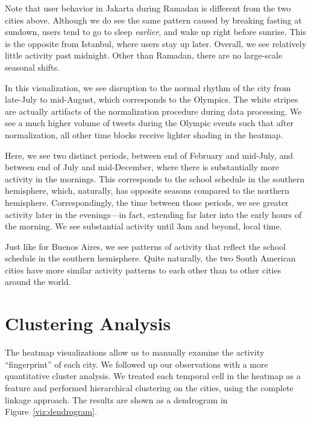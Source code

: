 \documentclass[letterpaper]{article}
\begin{document}
Note that user behavior in Jakarta during Ramadan is different from
the two cities above. Although we do see the same pattern caused
by breaking fasting at sundown, users tend to go to sleep
{\it earlier}, and wake up right before sunrise.
This is the opposite from Istanbul, where
users stay up later. Overall, we see relatively little activity past midnight. Other
than Ramadan, there are no large-scale seasonal shifts.


\smallskip {} In this visualization, we see
disruption to the normal rhythm of the city from late-July to
mid-August, which corresponds to the Olympics. The white stripes are
actually artifacts of the normalization procedure during data
processing. We see a much higher volume of tweets during the Olympic
events such that after normalization, all other time blocks
receive lighter shading in the heatmap.

\smallskip {} Here, we see two distinct
periods, between end of February and mid-July, and between end of July
and mid-December, where there is substantially more activity in the
mornings. This corresponds to the school schedule in the southern
hemisphere, which, naturally, has opposite seasons compared to
the northern hemisphere. Correspondingly, the time between those
periods, we see greater activity later in the evenings---in fact,
extending far later into the early hours of the morning. We see
substantial activity until 3am and beyond, local time.

\smallskip {} Just like for Buenos Aires,
we see patterns of activity that reflect the school schedule in the
southern hemisphere. Quite naturally, the two South American cities
have more similar activity patterns to each other than to other cities
around the world.

\section{Clustering Analysis}

The heatmap visualizations allow us to manually examine the activity
``fingerprint'' of each city. We followed up our observations with a
more quantitative cluster analysis. We treated
each temporal cell in the heatmap as a feature and performed
hierarchical clustering on the cities, using the complete linkage
approach. The results are shown as a dendrogram in
Figure~\ref{viz:dendrogram}.
\end{document}
